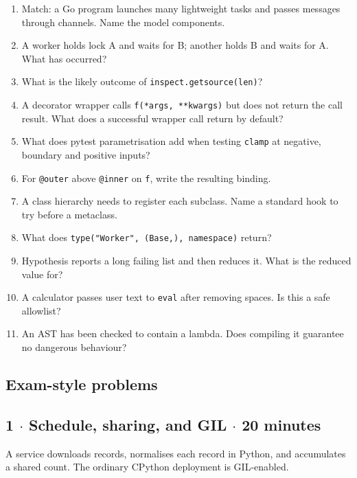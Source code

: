 \documentclass[11pt]{article}
\begin{document}
\begin{keepsection}
\begin{enumerate}
\item Match: a Go program launches many lightweight tasks and passes messages through channels. Name the model components.
\item A worker holds lock A and waits for B; another holds B and waits for A. What has occurred?
\item What is the likely outcome of \texttt{inspect.getsource(len)}?
\item A decorator wrapper calls \texttt{f(*args, **kwargs)} but does not return the call result. What does a successful wrapper call return by default?
\item What does pytest parametrisation add when testing \texttt{clamp} at negative, boundary and positive inputs?
\item For \texttt{@outer} above \texttt{@inner} on \texttt{f}, write the resulting binding.
\item A class hierarchy needs to register each subclass. Name a standard hook to try before a metaclass.
\item What does \texttt{type("Worker", (Base,), namespace)} return?
\item Hypothesis reports a long failing list and then reduces it. What is the reduced value for?
\item A calculator passes user text to \texttt{eval} after removing spaces. Is this a safe allowlist?
\item An AST has been checked to contain a lambda. Does compiling it guarantee no dangerous behaviour?
\end{enumerate}


\begin{keepsection}
\section{Exam-style problems}

\begin{keepsection}
\subsection{1 \ensuremath{\cdot} Schedule, sharing, and GIL \ensuremath{\cdot} 20 minutes}

A service downloads records, normalises each record in Python, and accumulates a shared count. The ordinary CPython deployment is GIL-enabled.


\end{keepsection}
\end{keepsection}
\end{keepsection}
\end{document}
